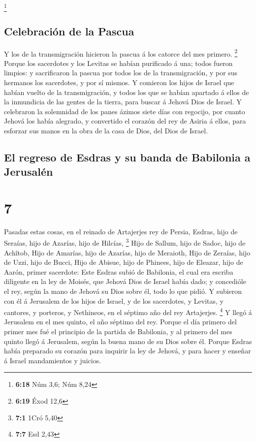 \footnote{\textbf{6:18} Núm 3,6; Núm 8,24}

\hypertarget{celebraciuxf3n-de-la-pascua}{%
\subsection{Celebración de la
Pascua}\label{celebraciuxf3n-de-la-pascua}}

 Y los de la transmigración hicieron la pascua á los
catorce del mes primero. \footnote{\textbf{6:19} Éxod 12,6}
 Porque los sacerdotes y los Levitas se habían purificado á
una; todos fueron limpios: y sacrificaron la pascua por todos los de la
transmigración, y por sus hermanos los sacerdotes, y por sí mismos.
 Y comieron los hijos de Israel que habían vuelto de la
transmigración, y todos los que se habían apartado á ellos de la
inmundicia de las gentes de la tierra, para buscar á Jehová Dios de
Israel.  Y celebraron la solemnidad de los panes ázimos
siete días con regocijo, por cuanto Jehová los había alegrado, y
convertido el corazón del rey de Asiria á ellos, para esforzar sus manos
en la obra de la casa de Dios, del Dios de Israel.

\hypertarget{el-regreso-de-esdras-y-su-banda-de-babilonia-a-jerusaluxe9n}{%
\subsection{El regreso de Esdras y su banda de Babilonia a
Jerusalén}\label{el-regreso-de-esdras-y-su-banda-de-babilonia-a-jerusaluxe9n}}

\hypertarget{section-6}{%
\section{7}\label{section-6}}

 Pasadas estas cosas, en el reinado de Artajerjes rey de
Persia, Esdras, hijo de Seraías, hijo de Azarías, hijo de Hilcías,
\footnote{\textbf{7:1} 1Cró 5,40}  Hijo de Sallum, hijo de
Sadoc, hijo de Achîtob,  Hijo de Amarías, hijo de Azarías,
hijo de Meraioth,  Hijo de Zeraías, hijo de Uzzi, hijo de
Bucci,  Hijo de Abisue, hijo de Phinees, hijo de Eleazar,
hijo de Aarón, primer sacerdote:  Este Esdras subió de
Babilonia, el cual era escriba diligente en la ley de Moisés, que Jehová
Dios de Israel había dado; y concedióle el rey, según la mano de Jehová
su Dios sobre él, todo lo que pidió.  Y subieron con él á
Jerusalem de los hijos de Israel, y de los sacerdotes, y Levitas, y
cantores, y porteros, y Nethineos, en el séptimo año del rey Artajerjes.
\footnote{\textbf{7:7} Esd 2,43}  Y llegó á Jerusalem en el
mes quinto, el año séptimo del rey.  Porque el día primero
del primer mes fué el principio de la partida de Babilonia, y al primero
del mes quinto llegó á Jerusalem, según la buena mano de su Dios sobre
él.  Porque Esdras había preparado su corazón para inquirir
la ley de Jehová, y para hacer y enseñar á Israel mandamientos y
juicios.


